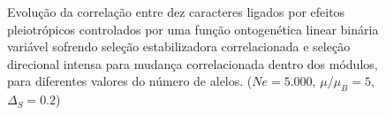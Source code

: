 \begin{figure}[htbp]
  \centering
  \vspace{11pt}
  \vspace{-18pt}
  \vspace{11pt}
  \caption{Evolução da correlação entre dez caracteres ligados por efeitos
  pleiotrópicos controlados por uma função ontogenética linear binária
  variável sofrendo seleção estabilizadora correlacionada e seleção
  direcional intensa para mudança correlacionada dentro dos módulos,
  para diferentes valores do número de alelos. ($Ne=5.000$, $\mu/\mu_B=5$, $\Delta_S=0.2$)}
  \label{MBLR}
\end{figure}
